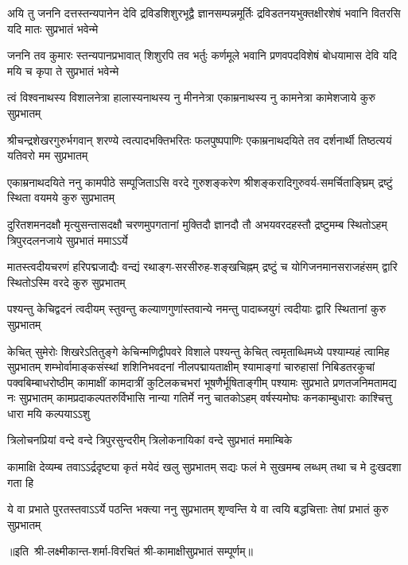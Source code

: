 \fourlineindentedshloka
{अयि तु जननि दत्तस्तन्यपानेन देवि}
{द्रविडशिशुरभूद्वै ज्ञानसम्पन्नमूर्तिः}
{द्रविडतनयभुक्तक्षीरशेषं भवानि}
{वितरसि यदि मातः सुप्रभातं भवेन्मे}

\fourlineindentedshloka
{जननि तव कुमारः स्तन्यपानप्रभावात्}
{शिशुरपि तव भर्तुः कर्णमूले भवानि}
{प्रणवपदविशेषं बोधयामास देवि}
{यदि मयि च कृपा ते सुप्रभातं भवेन्मे}

\fourlineindentedshloka
{त्वं विश्वनाथस्य विशालनेत्रा}
{हालास्यनाथस्य नु मीननेत्रा}
{एकाम्रनाथस्य नु कामनेत्रा}
{कामेशजाये कुरु सुप्रभातम्}

\fourlineindentedshloka
{श्रीचन्द्रशेखरगुरुर्भगवान् शरण्ये}
{त्वत्पादभक्तिभरितः फलपुष्पपाणिः}
{एकाम्रनाथदयिते तव दर्शनार्थी}
{तिष्ठत्ययं यतिवरो मम सुप्रभातम्}

\fourlineindentedshloka
{एकाम्रनाथदयिते ननु कामपीठे}
{सम्पूजिताऽसि वरदे गुरुशङ्करेण}
{श्रीशङ्करादिगुरुवर्य-समर्चिताङ्घ्रिम्}
{द्रष्टुं स्थिता वयमये कुरु सुप्रभातम्}

\fourlineindentedshloka
{दुरितशमनदक्षौ मृत्युसन्तासदक्षौ}
{चरणमुपगतानां मुक्तिदौ ज्ञानदौ तौ}
{अभयवरदहस्तौ द्रष्टुमम्ब स्थितोऽहम्}
{त्रिपुरदलनजाये सुप्रभातं ममाऽऽर्ये}

\fourlineindentedshloka
{मातस्त्वदीयचरणं हरिपद्मजाद्यैः}
{वन्द्यं रथाङ्ग-सरसीरुह-शङ्खचिह्नम्}
{द्रष्टुं च योगिजनमानसराजहंसम्}
{द्वारि स्थितोऽस्मि वरदे कुरु सुप्रभातम्}

\fourlineindentedshloka
{पश्यन्तु केचिद्वदनं त्वदीयम्}
{स्तुवन्तु कल्याणगुणांस्तवान्ये}
{नमन्तु पादाब्जयुगं त्वदीयाः}
{द्वारि स्थितानां कुरु सुप्रभातम्}

\fourlineindentedshloka
{केचित् सुमेरोः शिखरेऽतितुङ्गे}
{केचिन्मणिद्वीपवरे विशाले}
{पश्यन्तु केचित् त्वमृताब्धिमध्ये}
{पश्याम्यहं त्वामिह सुप्रभातम्}
\setlength{\shlokaspaceskip}{16pt}
\fourlineindentedshloka
{शम्भोर्वामाङ्कसंस्थां शशिनिभवदनां नीलपद्मायताक्षीम्}
{श्यामाङ्गां चारुहासां निबिडतरकुचां पक्वबिम्बाधरोष्ठीम्}
{कामाक्षीं कामदात्रीं कुटिलकचभरां भूषणैर्भूषिताङ्गीम्}
{पश्यामः सुप्रभाते प्रणतजनिमतामद्य नः सुप्रभातम्}
\setlength{\shlokaspaceskip}{24pt}
\fourlineindentedshloka
{कामप्रदाकल्पतरुर्विभासि}
{नान्या गतिर्मे ननु चातकोऽहम्}
{वर्षस्यमोघः कनकाम्बुधाराः}
{काश्चित्तु धारा मयि कल्पयाऽऽशु}

\twolineshloka
{त्रिलोचनप्रियां वन्दे वन्दे त्रिपुरसुन्दरीम्}
{त्रिलोकनायिकां वन्दे सुप्रभातं ममाम्बिके}

\fourlineindentedshloka
{कामाक्षि देव्यम्ब तवाऽऽर्द्रदृष्ट्या}
{कृतं मयेदं खलु सुप्रभातम्}
{सद्यः फलं मे सुखमम्ब लब्धम्}
{तथा च मे दुःखदशा गता हि}

\fourlineindentedshloka
{ये वा प्रभाते पुरतस्तवाऽऽर्ये}
{पठन्ति भक्त्या ननु सुप्रभातम्}
{शृण्वन्ति ये वा त्वयि बद्धचित्ताः}
{तेषां प्रभातं कुरु सुप्रभातम्}

॥इति~श्री-लक्ष्मीकान्त-शर्मा-विरचितं श्री-कामाक्षीसुप्रभातं सम्पूर्णम्॥